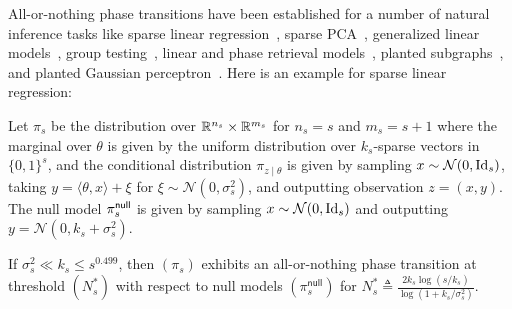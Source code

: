 All-or-nothing phase transitions have been established for a number of natural inference tasks like sparse linear regression~\citep{reeves2019allornothingphenomenonsparselinear,gamarnik2019highdimensionalregressionbinarycoefficients}, sparse PCA~\citep{NEURIPS2020_cd0b43ea}, generalized linear models~\citep{barbier2020allornothingstatisticalcomputationalphase}, group testing~\citep{truong2021allornothingbehaviorbernoulligroup,pmlr-v178-coja-oghlan22a}, linear and phase retrieval models~\citep{scarlett2016limitssupportrecoveryprobabilistic,truong2020supportrecoveryphaseretrieval}, planted subgraphs~\citep{pmlr-v195-mossel23a}, and planted Gaussian perceptron~\citep{nilesweed2023allnothingsharpphase}. Here is an example for sparse linear regression:

\begin{theorem}\label{thm:formal_aon_sparse}
Let $\pi_s$ be the distribution over $\mathbb{R}^{n_s} \times \mathbb{R}^{m_s}$ for $n_s = s$ and $m_s = s+1$ where the marginal over $\theta$ is given by the uniform distribution over $k_s$-sparse vectors in $\{0,1\}^s$, and the conditional distribution $\pi_{z\mid \theta}$ is given by sampling $x\sim \mathcal{N}(0,\mathrm{Id}_s)$, taking $y = \langle \theta, x\rangle + \xi$ for $\xi\sim \mathcal{N}(0,\sigma^2_s)$, and outputting observation $z = (x,y)$. The null model $\pi^{\sf null}_s$ is given by sampling $x\sim \mathcal{N}(0,\mathrm{Id}_s)$ and outputting $y = \mathcal{N}(0,k_s + \sigma^2_s)$.

If $\sigma^2_s \ll k_s \le s^{0.499}$, then $(\pi_s)$ exhibits an all-or-nothing phase transition at threshold $(N^*_s)$ with respect to null models $(\pi^{\mathsf{null}}_s)$ for $N^*_s \triangleq \frac{2k_s \log(s / k_s)}{\log(1 + k_s/\sigma^2_s)}$.
\end{theorem}


